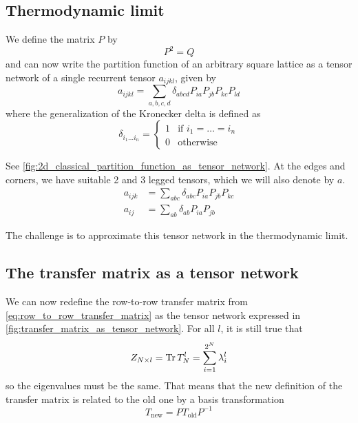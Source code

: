 \subsection{Thermodynamic limit}

We define the matrix $P$ by
\begin{equation}
  P^2 = Q
\end{equation}
and can now write the partition function of an arbitrary square lattice as a tensor
network of a single recurrent tensor $a_{i j k l}$, given by
\begin{equation}
  a_{i j k l} = \sum_{a, b, c, d} \delta_{a b c d} P_{i a} P_{j b} P_{k c} P_{l d}
\end{equation}
where the generalization of the Kronecker delta is defined as
\begin{equation}
  \delta_{i_1 \dots i_n} =
  \begin{cases}
    1 & \text{if } i_1 = \ldots = i_n \\
    0 & \text{otherwise}
  \end{cases}
\end{equation}

See \autoref{fig:2d_classical_partition_function_as_tensor_network}. At the edges and
corners, we have suitable 2 and 3 legged tensors, which we will also denote by $a$.
\begin{align*}
  a_{i j k} &= \sum_{a b c} \delta_{a b c} P_{i a} P_{j b} P_{k c} \\
  a_{i j} &= \sum_{a b} \delta_{a b} P_{i a} P_{j b}
\end{align*}

The challenge is to approximate this tensor network in the thermodynamic limit.


\subsection{The transfer matrix as a tensor network}

We can now redefine the row-to-row transfer matrix from
\autoref{eq:row_to_row_transfer_matrix} as the tensor network expressed in
\autoref{fig:transfer_matrix_as_tensor_network}. For all $l$, it is still true that
\begin{equation}
  Z_{N \times l} = \operatorname{Tr} T_{N}^{l} = \sum_{i = 1}^{2^N} \lambda_{i}^{l}
\end{equation}
so the eigenvalues must be the same. That means that the new definition of the transfer
matrix is related to the old one by a basis transformation
\begin{equation}
  T_{\text{new}} = P T_{\text{old}} P^{-1}
\end{equation}



